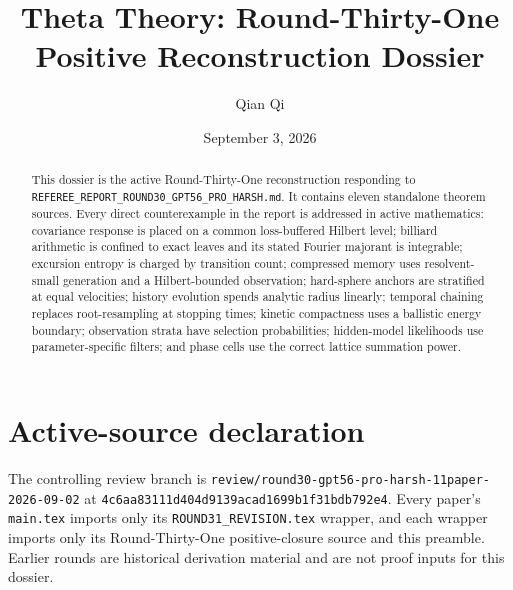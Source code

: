 \documentclass[11pt,reqno]{amsart}
\title{Theta Theory: Round-Thirty-One Positive Reconstruction Dossier}
\author{Qian Qi}
\date{September 3, 2026}
\begin{document}
\begin{abstract}
This dossier is the active Round-Thirty-One reconstruction responding to
\texttt{REFEREE\_REPORT\_ROUND30\_GPT56\_PRO\_HARSH.md}.  It contains eleven
standalone theorem sources.  Every direct counterexample in the report is
addressed in active mathematics: covariance response is placed on a common
loss-buffered Hilbert level; billiard arithmetic is confined to exact leaves
and its stated Fourier majorant is integrable; excursion entropy is charged by
transition count; compressed memory uses resolvent-small generation and a
Hilbert-bounded observation; hard-sphere anchors are stratified at equal
velocities; history evolution spends analytic radius linearly; temporal
chaining replaces root-resampling at stopping times; kinetic compactness uses
a ballistic energy boundary; observation strata have selection probabilities;
hidden-model likelihoods use parameter-specific filters; and phase cells use
the correct lattice summation power.
\end{abstract}
\maketitle
\tableofcontents

\section*{Active-source declaration}
The controlling review branch is
\texttt{review/round30-gpt56-pro-harsh-11paper-2026-09-02} at
\texttt{4c6aa83111d404d9139acad1699b1f31bdb792e4}.  Every paper's
\texttt{main.tex} imports only its \texttt{ROUND31\_REVISION.tex} wrapper,
and each wrapper imports only its Round-Thirty-One positive-closure source and
this preamble.  Earlier rounds are historical derivation material and are not
proof inputs for this dossier.

\clearpage

\clearpage

\clearpage

\clearpage

\clearpage

\clearpage

\clearpage

\clearpage

\clearpage

\clearpage

\clearpage

\end{document}
